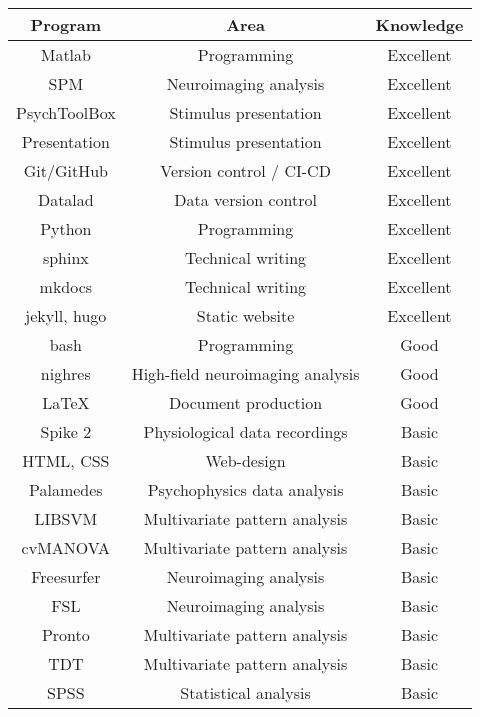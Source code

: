 
\begin{center}
\begin{tabular}[c]{|c|c|c|}
\hline\hline
Program         & Area                              & Knowledge \\
\hline
Matlab          & Programming                       & Excellent \\
SPM             & Neuroimaging analysis             & Excellent \\
PsychToolBox    & Stimulus presentation             & Excellent \\
Presentation    & Stimulus presentation             & Excellent \\
Git/GitHub      & Version control / CI-CD           & Excellent \\
Datalad         & Data version control              & Excellent \\
Python          & Programming                       & Excellent \\
sphinx          & Technical writing                 & Excellent \\
mkdocs          & Technical writing                 & Excellent \\
jekyll, hugo    & Static website                    & Excellent \\
bash            & Programming                       & Good \\
nighres         & High-field neuroimaging analysis  & Good \\
\LaTeX          & Document production               & Good \\
Spike 2         & Physiological data recordings     & Basic \\
HTML, CSS       & Web-design                        & Basic \\
Palamedes       & Psychophysics data analysis       & Basic \\
LIBSVM          & Multivariate pattern analysis     & Basic \\
cvMANOVA        & Multivariate pattern analysis     & Basic \\
Freesurfer      & Neuroimaging analysis             & Basic \\
FSL             & Neuroimaging analysis             & Basic \\
Pronto          & Multivariate pattern analysis     & Basic \\
TDT             & Multivariate pattern analysis     & Basic \\
SPSS            & Statistical analysis              & Basic \\
\hline\hline
\end{tabular}
\end{center}

